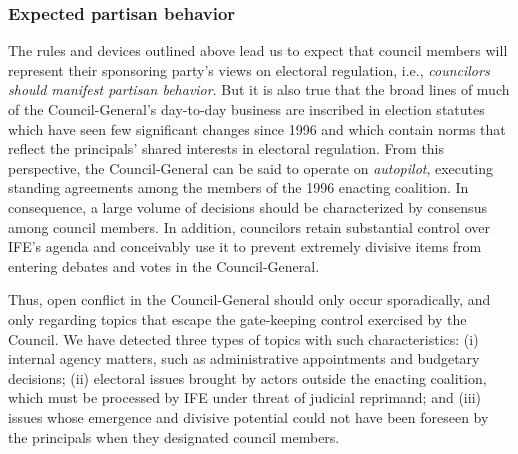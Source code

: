 \documentclass[12 pt, letter]{article}
\begin{document}
\subsubsection{Expected partisan behavior}
The rules and devices outlined above lead us to expect that council members will represent their sponsoring party's views on electoral regulation, i.e., \emph{councilors should manifest partisan behavior}.  But it is also true that the broad lines of much of the Council-General's day-to-day business are inscribed in election statutes which have seen few significant changes since 1996 and which contain norms that reflect the principals' shared interests in electoral regulation.  From this perspective, the Council-General can be said to operate on \emph{autopilot}, executing standing agreements among the members of the 1996 enacting coalition.  In consequence, a large volume of decisions should be characterized by consensus among council members.  In addition, councilors retain substantial control over IFE's agenda and conceivably use it to prevent extremely divisive items from entering debates and votes in the Council-General.

Thus, open conflict in the Council-General should only occur sporadically, and only regarding topics that escape the gate-keeping control exercised by the Council. We have detected three types of topics with such characteristics: (i) internal agency matters, such as administrative appointments and budgetary decisions; (ii) electoral issues brought by actors outside the enacting coalition, which must be processed by IFE under threat of judicial reprimand; and (iii) issues whose emergence and divisive potential could not have been foreseen by the principals when they designated council members.
\end{document}
